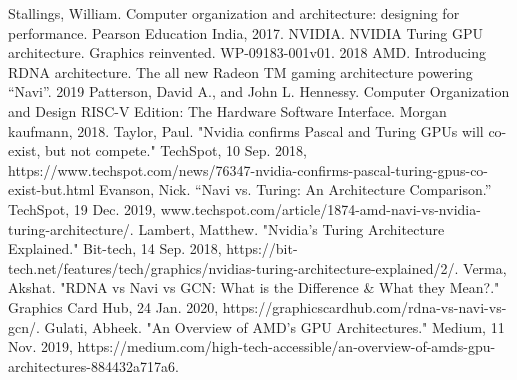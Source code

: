 \documentclass[letterpaper, 10 pt, conference]{ieeeconf}  %
\begin{document}
\begin{thebibliography}{99}

 Stallings, William. Computer organization and architecture: designing for performance. Pearson Education India, 2017.
 NVIDIA. NVIDIA Turing GPU architecture. Graphics reinvented. WP-09183-001v01. 2018
 AMD. Introducing RDNA architecture. The all new Radeon TM gaming architecture powering “Navi”. 2019
 Patterson, David A., and John L. Hennessy. Computer Organization and Design RISC-V Edition: The Hardware Software Interface. Morgan kaufmann, 2018.
 Taylor, Paul. "Nvidia confirms Pascal and Turing GPUs will co-exist, but not compete." TechSpot, 10 Sep. 2018, https://www.techspot.com/news/76347-nvidia-confirms-pascal-turing-gpus-co-exist-but.html
 Evanson, Nick. “Navi vs. Turing: An Architecture Comparison.” TechSpot, 19 Dec. 2019, www.techspot.com/article/1874-amd-navi-vs-nvidia-turing-architecture/.
 Lambert, Matthew. "Nvidia’s Turing Architecture Explained." Bit-tech, 14 Sep. 2018, https://bit-tech.net/features/tech/graphics/nvidias-turing-architecture-explained/2/.
 Verma, Akshat. "RDNA vs Navi vs GCN: What is the Difference & What they Mean?." Graphics Card Hub, 24 Jan. 2020, https://graphicscardhub.com/rdna-vs-navi-vs-gcn/.
 Gulati, Abheek. "An Overview of AMD’s GPU Architectures." Medium, 11 Nov. 2019, https://medium.com/high-tech-accessible/an-overview-of-amds-gpu-architectures-884432a717a6.





\end{thebibliography}
\end{document}

